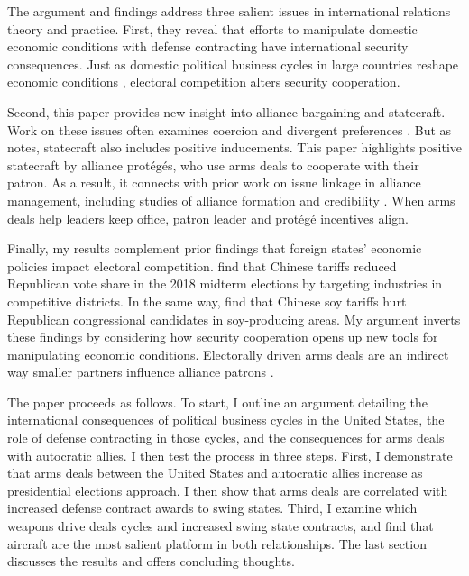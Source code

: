 \documentclass[12pt]{article}
\begin{document}
The argument and findings address three salient issues in international relations theory and practice. 
First, they reveal that efforts to manipulate domestic economic conditions with defense contracting have international security consequences. 
Just as domestic political business cycles in large countries reshape economic conditions \citep{Kayser2006, Kayser2009}, electoral competition alters security cooperation. 


Second, this paper provides new insight into alliance bargaining and statecraft. 
Work on these issues often examines coercion and divergent preferences \citep{Oatley2015, WolfordKim2017, Blankenship2020, Beckeretal2023}. %
But as \citet{Baldwin2020} notes, statecraft also includes positive inducements. 
This paper highlights positive statecraft by alliance prot{\'e}g{\'e}s, who use arms deals to cooperate with their patron.
As a result, it connects with prior work on issue linkage in alliance management, including studies of alliance formation \citep{Poast2012} and credibility \citep{Davis2008, Poast2013}.
When arms deals help leaders keep office, patron leader and prot{\'e}g{\'e} incentives align.


Finally, my results complement prior findings that foreign states' economic policies impact electoral competition. 
\citet{KimMargalit2021} find that Chinese tariffs reduced Republican vote share in the 2018 midterm elections by targeting industries in competitive districts.
In the same way, \citet{ChyzhUrbatsch2021} find that Chinese soy tariffs hurt Republican congressional candidates in soy-producing areas. 
My argument inverts these findings by considering how security cooperation opens up new tools for manipulating economic conditions. 
Electorally driven arms deals are an indirect way smaller partners influence alliance patrons \citep{Keohane1971}.


The paper proceeds as follows. 
To start, I outline an argument detailing the international consequences of political business cycles in the United States, the role of defense contracting in those cycles, and the consequences for arms deals with autocratic allies. 
I then test the process in three steps. 
First, I demonstrate that arms deals between the United States and autocratic allies increase as presidential elections approach.
I then show that arms deals are correlated with increased defense contract awards to swing states.
Third, I examine which weapons drive deals cycles and increased swing state contracts, and find that aircraft are the most salient platform in both relationships. 
The last section discusses the results and offers concluding thoughts.
\end{document}
